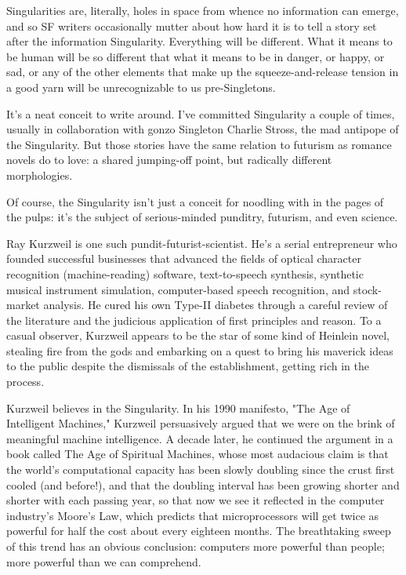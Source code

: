 Singularities are, literally, holes in space from whence no
information can emerge, and so SF writers occasionally mutter about
how hard it is to tell a story set after the information
Singularity. Everything will be different. What it means to be
human will be so different that what it means to be in danger, or
happy, or sad, or any of the other elements that make up the
squeeze-and-release tension in a good yarn will be unrecognizable
to us pre-Singletons.

It's a neat conceit to write around. I've committed Singularity a
couple of times, usually in collaboration with gonzo Singleton
Charlie Stross, the mad antipope of the Singularity. But those
stories have the same relation to futurism as romance novels do to
love: a shared jumping-off point, but radically different
morphologies.

Of course, the Singularity isn't just a conceit for noodling with
in the pages of the pulps: it's the subject of serious-minded
punditry, futurism, and even science.

Ray Kurzweil is one such pundit-futurist-scientist. He's a serial
entrepreneur who founded successful businesses that advanced the
fields of optical character recognition (machine-reading) software,
text-to-speech synthesis, synthetic musical instrument simulation,
computer-based speech recognition, and stock-market analysis. He
cured his own Type-II diabetes through a careful review of the
literature and the judicious application of first principles and
reason. To a casual observer, Kurzweil appears to be the star of
some kind of Heinlein novel, stealing fire from the gods and
embarking on a quest to bring his maverick ideas to the public
despite the dismissals of the establishment, getting rich in the
process.

Kurzweil believes in the Singularity. In his 1990 manifesto, "The
Age of Intelligent Machines," Kurzweil persuasively argued that we
were on the brink of meaningful machine intelligence. A decade
later, he continued the argument in a book called The Age of
Spiritual Machines, whose most audacious claim is that the world's
computational capacity has been slowly doubling since the crust
first cooled (and before!), and that the doubling interval has been
growing shorter and shorter with each passing year, so that now we
see it reflected in the computer industry's Moore's Law, which
predicts that microprocessors will get twice as powerful for half
the cost about every eighteen months. The breathtaking sweep of
this trend has an obvious conclusion: computers more powerful than
people; more powerful than we can comprehend.

